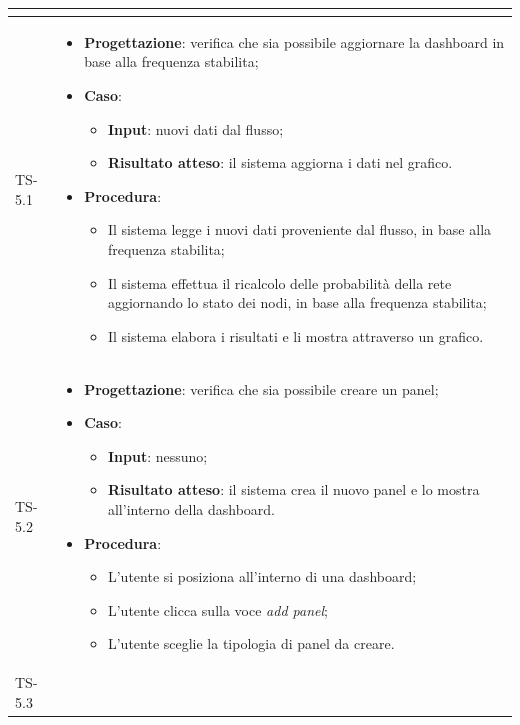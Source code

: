 \begin{longtable}{|C{2.5cm}|C{13cm}|}
\begin{itemize}
\end{itemize}
	\\
	\hline
	{TS-5.1} & 
\begin{itemize}
	\item \textbf{Progettazione}: verifica che sia possibile aggiornare la
	dashboard in base alla frequenza stabilita;
	\item \textbf{Caso}: 
	\begin{itemize}
		\item \textbf{Input}: nuovi dati dal flusso;
		\item \textbf{Risultato atteso}: il sistema aggiorna i dati nel grafico.
	\end{itemize}
	\item \textbf{Procedura}:
	\begin{itemize}
		\item Il sistema legge i nuovi dati proveniente dal flusso, in base alla frequenza stabilita;
		\item Il sistema effettua il ricalcolo delle probabilità della rete aggiornando lo stato dei nodi, in base alla frequenza stabilita;
		\item Il sistema elabora i risultati e li mostra attraverso un grafico.
	\end{itemize} 
\end{itemize}
\\
	\hline
	{TS-5.2} & 
\begin{itemize}
	\item \textbf{Progettazione}: verifica che sia possibile creare un panel;
	\item \textbf{Caso}: 
	\begin{itemize}
		\item \textbf{Input}: nessuno;
		\item \textbf{Risultato atteso}: il sistema crea il nuovo panel e lo mostra all'interno della dashboard.
	\end{itemize}
	\item \textbf{Procedura}:
	\begin{itemize}
		\item L'utente si posiziona all'interno di una dashboard;
		\item L'utente clicca sulla voce \emph{add panel};
		\item L'utente sceglie la tipologia di panel da creare.
	\end{itemize} 
\end{itemize}
 \\
	\hline
	{TS-5.3} & 
\begin{itemize}

\end{itemize}
\end{longtable}
